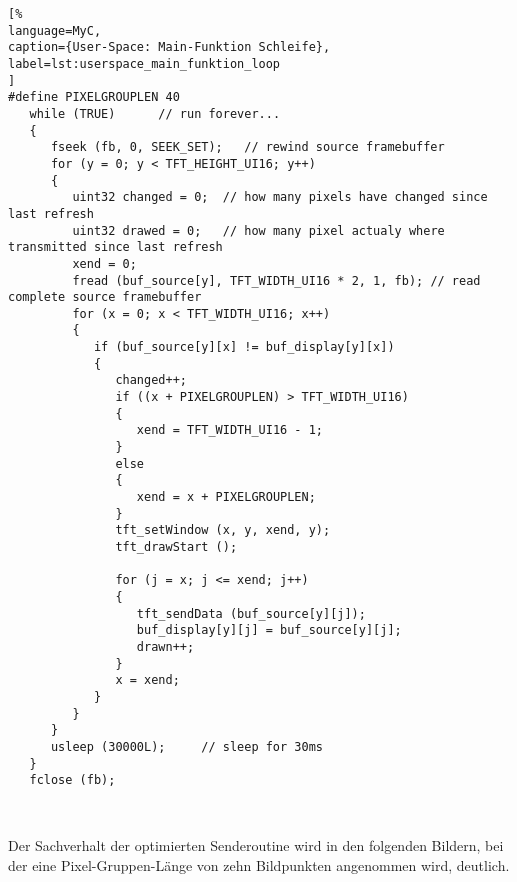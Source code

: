 \begin{lstlisting}[%
language=MyC,
caption={User-Space: Main-Funktion Schleife},
label=lst:userspace_main_funktion_loop
]
#define PIXELGROUPLEN 40
   while (TRUE)      // run forever...
   {
      fseek (fb, 0, SEEK_SET);   // rewind source framebuffer
      for (y = 0; y < TFT_HEIGHT_UI16; y++)
      {
         uint32 changed = 0;  // how many pixels have changed since last refresh
         uint32 drawed = 0;   // how many pixel actualy where transmitted since last refresh
         xend = 0;
         fread (buf_source[y], TFT_WIDTH_UI16 * 2, 1, fb); // read complete source framebuffer
         for (x = 0; x < TFT_WIDTH_UI16; x++)
         {
            if (buf_source[y][x] != buf_display[y][x])
            {
               changed++;
               if ((x + PIXELGROUPLEN) > TFT_WIDTH_UI16)
               {
                  xend = TFT_WIDTH_UI16 - 1;
               }
               else
               {
                  xend = x + PIXELGROUPLEN;
               }
               tft_setWindow (x, y, xend, y);
               tft_drawStart ();

               for (j = x; j <= xend; j++)
               {
                  tft_sendData (buf_source[y][j]);
                  buf_display[y][j] = buf_source[y][j];
                  drawn++;
               }
               x = xend;
            }
         }
      }
      usleep (30000L);     // sleep for 30ms
   }
   fclose (fb);



\end{lstlisting}
\newpage
Der Sachverhalt der optimierten Senderoutine wird in den folgenden Bildern, bei der eine Pixel-Gruppen-Länge von zehn Bildpunkten angenommen wird, deutlich. 

